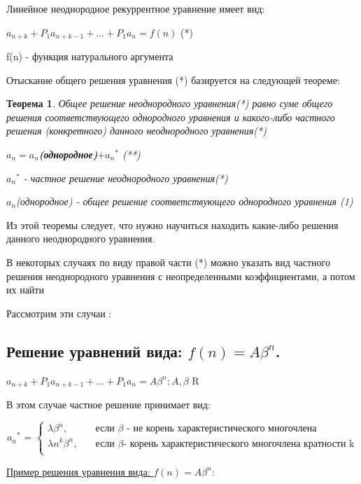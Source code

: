 \documentclass[12pt, a4paper, oneside]{article}
\theoremstyle{plain} %
\newtheorem{theorem}{Теорема}[section]
\theoremstyle{definition}
\begin{document}
Линейное неоднородное рекуррентное уравнение имеет вид: 

$a_{n+k}+P_1  a_{n+k-1}+ ... + P_1a_{n} = f(n)$ (*)

f(n) - функция натурального аргумента

Отыскание общего решения уравнения (*) базируется на следующей теореме:

\begin{theorem}

Общее решение неоднородного уравнения(*) равно суме общего решения соответствующего однородного уравнения  и какого-либо частного решения (конкретного) данного неоднородного уравнения(*) 

\textbf{$a_n = a_n$(однородное)$ + {a_n}^*$} (**) 

${a_n}^*$ - частное решение неоднородного уравнения(*)

$a_n$(однородное) - общее решение соответствующего однородного уравнения (1) 

\end{theorem}

Из этой теоремы следует, что нужно научиться находить какие-либо решения данного неоднородного уравнения.

В некоторых случаях по виду правой части (*) можно указать вид частного решения неоднородного уравнения с неопределенными коэффициентами, а потом их найти 

Рассмотрим эти случаи :

\subsection{Решение уравнений вида: \texorpdfstring{$f(n) = A \beta^n$}{Lg}.}

$a_{n+k}+P_1  a_{n+k-1}+ ... + P_1 a_{n} = A \beta^n; A,\beta$ \in R

В этом случае  частное решение принимает вид:

\[ 
    \textbf{${a_n}^*$ = }
    \begin{cases}
         \lambda \beta^n, &\quad\text{если }  
         \beta \text{ - не корень характеристического многочлена}\\
        
        \lambda n ^ k \beta^n ,  &\quad\text{если }   \beta  \text{-  корень характеристического многочлена кратности k}\\
    \end{cases}
\]

\underline{Пример решения уравнения вида: \texorpdfstring{$f(n) = A \beta^n$}{Lg}}:
\end{document}
